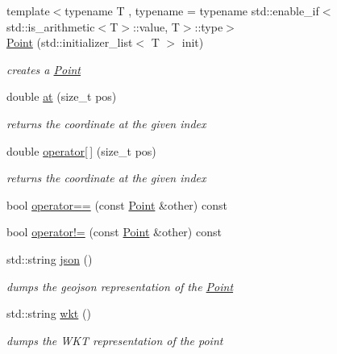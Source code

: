 \begin{DoxyCompactItemize}
{\footnotesize template$<$typename T , typename  = typename std\-::enable\-\_\-if$<$std\-::is\-\_\-arithmetic$<$\-T$>$\-::value, T$>$\-::type$>$ }\\\hyperlink{classsimo_1_1shapes_1_1_point_a8378b498b96e68e341407007a6d69b91}{Point} (std\-::initializer\-\_\-list$<$ T $>$ init)
\begin{DoxyCompactList}\small\item\em creates a \hyperlink{classsimo_1_1shapes_1_1_point}{Point} \end{DoxyCompactList}\item 
double \hyperlink{classsimo_1_1shapes_1_1_point_aac896c5b6bb2ba85442a639e611534df}{at} (size\-\_\-t pos)
\begin{DoxyCompactList}\small\item\em returns the coordinate at the given index \end{DoxyCompactList}\item 
double \hyperlink{classsimo_1_1shapes_1_1_point_a72cdeb0d8d8ecfdd5c5f4da19ec33cc4}{operator\mbox{[}$\,$\mbox{]}} (size\-\_\-t pos)
\begin{DoxyCompactList}\small\item\em returns the coordinate at the given index \end{DoxyCompactList}\item 
bool \hyperlink{classsimo_1_1shapes_1_1_point_a32b64226c96ab13e4b44e7437c2f6b3e}{operator==} (const \hyperlink{classsimo_1_1shapes_1_1_point}{Point} \&other) const 
\item 
bool \hyperlink{classsimo_1_1shapes_1_1_point_aece2f7cb87b1ca009d29fb79fcf8b48a}{operator!=} (const \hyperlink{classsimo_1_1shapes_1_1_point}{Point} \&other) const 
\item 
std\-::string \hyperlink{classsimo_1_1shapes_1_1_point_ab16bf7c8f22a3fbd0df4e8a7407eeda5}{json} ()
\begin{DoxyCompactList}\small\item\em dumps the geojson representation of the \hyperlink{classsimo_1_1shapes_1_1_point}{Point} \end{DoxyCompactList}\item 
std\-::string \hyperlink{classsimo_1_1shapes_1_1_point_a4134ec6fcf72ca4d822a9a70788dee40}{wkt} ()
\begin{DoxyCompactList}\small\item\em dumps the W\-K\-T representation of the point \end{DoxyCompactList}\end{DoxyCompactItemize}
